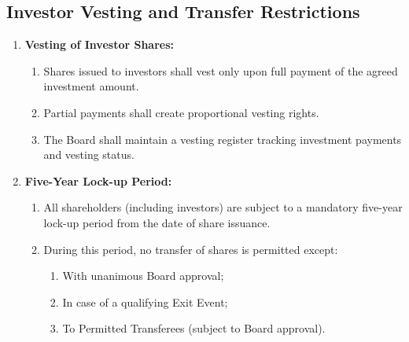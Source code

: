 \subsection{Investor Vesting and Transfer Restrictions}
\begin{enumerate}[label=(\alph*)]
\item \textbf{Vesting of Investor Shares:}
    \begin{enumerate}[label=(\roman*)]
    \item Shares issued to investors shall vest only upon full payment of the agreed investment amount.
    \item Partial payments shall create proportional vesting rights.
    \item The Board shall maintain a vesting register tracking investment payments and vesting status.
    \end{enumerate}

\item \textbf{Five-Year Lock-up Period:}
    \begin{enumerate}[label=(\roman*)]
    \item All shareholders (including investors) are subject to a mandatory five-year lock-up period from the date of share issuance.
    \item During this period, no transfer of shares is permitted except:
        \begin{enumerate}[label=(\alph*)]
        \item With unanimous Board approval;
        \item In case of a qualifying Exit Event;
        \item To Permitted Transferees (subject to Board approval).
        \end{enumerate}
    \end{enumerate}


\end{enumerate}
